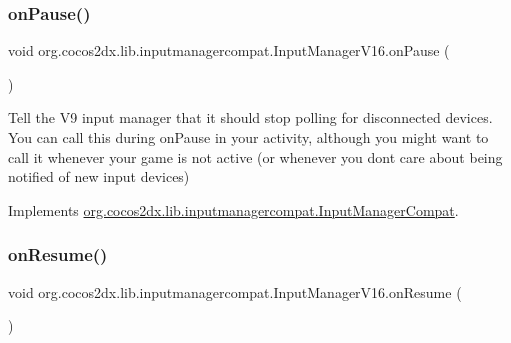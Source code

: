 \mbox{\label{classorg_1_1cocos2dx_1_1lib_1_1inputmanagercompat_1_1InputManagerV16_a06c3db7d607a8a43c9d27565dd759340}} 
\subsubsection{\texorpdfstring{on\+Pause()}{onPause()}\hspace{0.1cm}{\footnotesize\ttfamily [2/2]}}
{\footnotesize\ttfamily void org.\+cocos2dx.\+lib.\+inputmanagercompat.\+Input\+Manager\+V16.\+on\+Pause (\begin{DoxyParamCaption}{ }\end{DoxyParamCaption})\hspace{0.3cm}{\ttfamily [inline]}}

Tell the V9 input manager that it should stop polling for disconnected devices. You can call this during on\+Pause in your activity, although you might want to call it whenever your game is not active (or whenever you don\textquotesingle{}t care about being notified of new input devices) 

Implements \hyperlink{interfaceorg_1_1cocos2dx_1_1lib_1_1inputmanagercompat_1_1InputManagerCompat_a75e607a2bc756ca935665236f995dd0e}{org.\+cocos2dx.\+lib.\+inputmanagercompat.\+Input\+Manager\+Compat}.

\mbox{\label{classorg_1_1cocos2dx_1_1lib_1_1inputmanagercompat_1_1InputManagerV16_a06cacfc2a899e281361bfd190d35bcec}} 
\subsubsection{\texorpdfstring{on\+Resume()}{onResume()}\hspace{0.1cm}{\footnotesize\ttfamily [1/2]}}
{\footnotesize\ttfamily void org.\+cocos2dx.\+lib.\+inputmanagercompat.\+Input\+Manager\+V16.\+on\+Resume (\begin{DoxyParamCaption}{ }\end{DoxyParamCaption})\hspace{0.3cm}{\ttfamily [inline]}}

